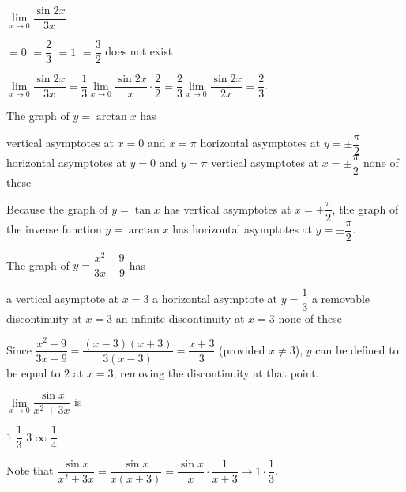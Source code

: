 \question
$\lim\limits_{x \to 0} \dfrac{\sin 2 x}{3 x}$
\begin{choices}
  \choice $=0$
  \CorrectChoice $=\dfrac{2}{3}$
  \choice $=1$
  \choice $=\dfrac{3}{2}$
  \choice does not exist
\end{choices}
\begin{solution}
$\lim\limits_{x \to 0} \dfrac{\sin 2 x}{3 x}=\dfrac{1}{3} \lim\limits_{x \to 0} \dfrac{\sin 2 x}{x} \cdot \dfrac{2}{2}=\dfrac{2}{3} \lim\limits_{x \to 0} \dfrac{\sin 2 x}{2 x}=\dfrac{2}{3}$.
\end{solution}

\question
The graph of $y=\arctan x$ has
\begin{choices}
  \choice vertical asymptotes at $x=0$ and $x=\pi$
  \CorrectChoice horizontal asymptotes at $y=\pm \dfrac{\pi}{2}$
  \choice horizontal asymptotes at $y=0$ and $y=\pi$
  \choice vertical asymptotes at $x=\pm \dfrac{\pi}{2}$
  \choice none of these
\end{choices}
\begin{solution}
Because the graph of $y=\tan x$ has vertical asymptotes at $x=\pm \dfrac{\pi}{2}$, the graph of the inverse function $y=\arctan x$ has horizontal asymptotes at $y=\pm \dfrac{\pi}{2}$.
\end{solution}

\question
The graph of $y=\dfrac{x^{2}-9}{3 x-9}$ has
\begin{choices}
  \choice a vertical asymptote at $x=3$
  \choice a horizontal asymptote at $y=\dfrac{1}{3}$
  \CorrectChoice a removable discontinuity at $x=3$
  \choice an infinite discontinuity at $x=3$
  \choice none of these
\end{choices}
\begin{solution}
Since $\dfrac{x^{2}-9}{3 x-9}=\dfrac{(x-3)(x+3)}{3(x-3)}=\dfrac{x+3}{3}$ (provided $x \neq 3$), $y$ can be defined to be equal to $2$ at $x=3$, removing the discontinuity at that point.
\end{solution}


\newpage

\question
$\lim\limits_{x \to 0} \dfrac{\sin x}{x^{2}+3 x}$ is
\begin{choices}
  \choice $1$
  \CorrectChoice $\dfrac{1}{3}$
  \choice $3$
  \choice $\infty$
  \choice $\dfrac{1}{4}$
\end{choices}
\begin{solution}
Note that $\dfrac{\sin x}{x^{2}+3 x}=\dfrac{\sin x}{x(x+3)}=\dfrac{\sin x}{x} \cdot \dfrac{1}{x+3} \rightarrow 1 \cdot \dfrac{1}{3}$.
\end{solution}

